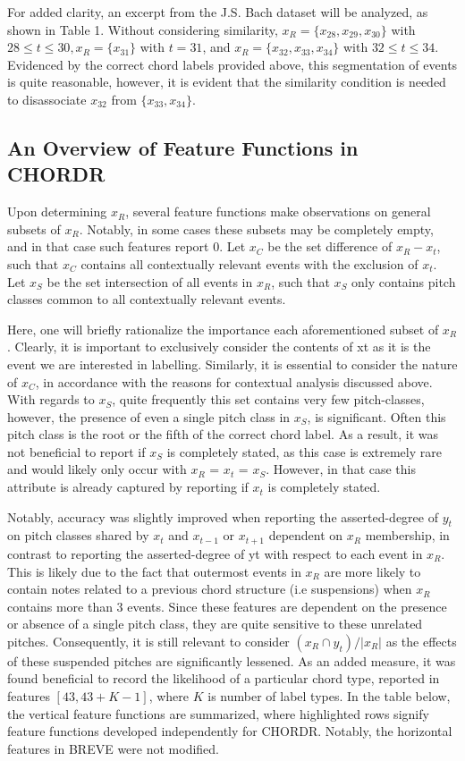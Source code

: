 \documentclass{article} %
\begin{document}
For added clarity, an excerpt from the J.S. Bach dataset will be analyzed, as shown in Table 1. Without considering similarity, $x_R = \{ x_{28}, x_{29}, x_{30} \}$ with $28 \leq t \leq 30, x_R = \{ x_{31} \}$ with $t = 31$, and $x_R = \{ x_{32}, x_{33}, x_{34} \}$ with $32 \leq t \leq 34$. Evidenced by the correct chord labels provided above, this segmentation of events is quite reasonable, however, it is evident that the similarity condition is needed to disassociate $x_{32}$ from $\{ x_{33}, x_{34} \}$.

\subsection{An Overview of Feature Functions in CHORDR}

Upon determining $x_R$, several feature functions make observations on general subsets of $x_R$. Notably, in some cases these subsets may be completely empty, and in that case such features report 0. Let $x_C$ be the set difference of $x_R - x_t$, such that $x_C$ contains all contextually relevant events with the exclusion of $x_t$. Let $x_S$ be the set intersection of all events in $x_R$, such that $x_S$ only contains pitch classes common to all contextually relevant events.

Here, one will briefly rationalize the importance each aforementioned subset of $x_R$. Clearly, it is important to exclusively consider the contents of xt as it is the event we are interested in labelling. Similarly, it is essential to consider the nature of $x_C$, in accordance with the reasons for contextual analysis discussed above. With regards to $x_S$, quite frequently this set contains very few pitch-classes, however, the presence of even a single pitch class in $x_S$, is significant. Often this pitch class is the root or the fifth of the correct chord label. As a result, it was not beneficial to report if $x_S$ is completely stated, as this case is extremely rare and would likely only occur with $x_R$ = $x_t$ = $x_S$. However, in that case this attribute is already captured by reporting if $x_t$ is completely stated.

Notably, accuracy was slightly improved when reporting the asserted-degree of $y_t$ on pitch classes shared by $x_t$ and $x_{t-1}$ or $x_{t+1}$ dependent on $x_R$ membership, in contrast to reporting the asserted-degree of yt with respect to each event in $x_R$. This is likely due to the fact that outermost events in $x_R$ are more likely to contain notes related to a previous chord structure (i.e suspensions) when $x_R$ contains more than 3 events. Since these features are dependent on the presence or absence of a single pitch class, they are quite sensitive to these unrelated pitches. Consequently, it is still relevant to consider $( x_R \cap y_t ) / |x_R|$ as the effects of these suspended pitches are significantly lessened. As an added measure, it was found beneficial to record the likelihood of a particular chord type, reported in features $[43, 43 + K - 1]$, where $K$ is number of label types. In the table below, the vertical feature functions are summarized, where highlighted rows signify feature functions developed independently for CHORDR. Notably, the horizontal features in BREVE were not modified.
\end{document}
